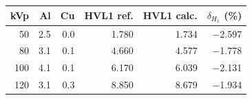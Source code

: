\begin{tabular}{rrrrrr}\toprule
kVp & Al & Cu & HVL1 ref. & HVL1 calc. & $\delta_{H_1}$ (\%)\\\midrule
50 & \num{2.5} & \num{0.0} & \num{1.780} & \num{1.734} & \num{-2.597}\\
80 & \num{3.1} & \num{0.1} & \num{4.660} & \num{4.577} & \num{-1.778}\\
100 & \num{4.1} & \num{0.1} & \num{6.170} & \num{6.039} & \num{-2.131}\\
120 & \num{3.1} & \num{0.3} & \num{8.850} & \num{8.679} & \num{-1.934}\\
\bottomrule\end{tabular}